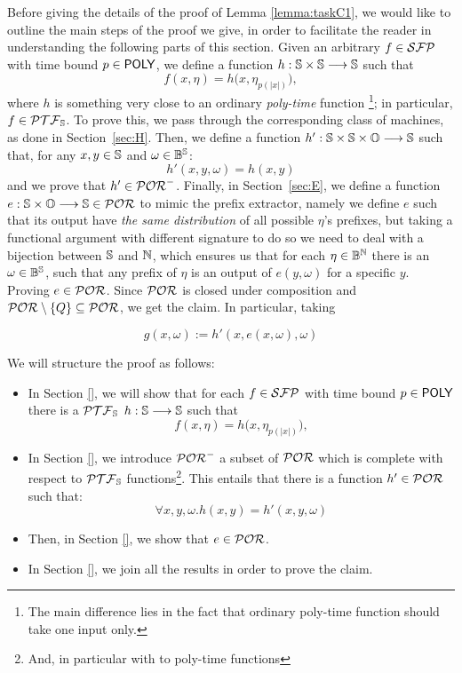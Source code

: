 Before giving the details of the proof of Lemma \ref{lemma:taskC1},
we would like to outline the main steps of the proof we give,
in order to facilitate the reader in understanding the following
parts of this section.
Given an arbitrary $f \in \mathcal{SFP}$ with time bound $p \in \mathsf{POLY}$,
we define a function $h:\mathbb{S} \times \mathbb{S} \longrightarrow \mathbb{S}$
such that
$$
f(x,\eta) = h\big(x, \eta_{p(|x|)}\big),
$$
where $h$ is something very close to an ordinary \emph{poly-time} function%
\footnote{The main difference lies in the fact that ordinary poly-time function should take one input only.}; in particular, $f \in \mathcal{PTF}_{\mathbb{S}}$.
To prove this, we pass
through the corresponding class of machines, as done in
Section~\ref{sec:H}.
%
Then, we define a function $h' : \mathbb{S} \times \mathbb{S} \times
\mathbb{O} \longrightarrow \mathbb{S}$ such that, for any $x,y\in \mathbb{S}$ and $\omega \in \mathbb{B}^{\mathbb{S}}$:
$$
h'(x,y,\omega) = h(x,y)
$$
and we prove that $h'\in \mathcal{POR}^-$.
%
Finally, in Section~\ref{sec:E},
we define a function
$e: \mathbb{S} \times \mathbb{O} \longrightarrow \mathbb{S} \in \mathcal{POR}$
 to mimic the prefix extractor, namely we
define $e$ such that its output have
\emph{the same distribution} of all possible $\eta$'s prefixes,
but taking a functional argument with different signature
to do so we need to deal with a bijection between $\mathbb{S}$ and $\mathbb{N}$,
which ensures us that for each $\eta \in \mathbb{B}^{\mathbb{N}}$
there is an $\omega\in \mathbb{B}^{\mathbb{S}}$, such that
any prefix of $\eta$ is an output of
$e(y, \omega)$ for a specific $y$.
Proving $e \in\mathcal{POR}$. Since $\mathcal{POR}$ is closed under composition and
$\mathcal{POR} \setminus \{Q\} \subseteq \mathcal{POR}$, we get the claim. In particular, taking

$$
g(x, \omega) := h'(x, e(x, \omega), \omega)
$$

%

We will structure the proof as follows:

\begin{itemize}
  \item In Section \ref{}, we will show that for each $f \in \mathcal{SFP}$
  with time bound $p \in \mathsf{POLY}$ there is a $\mathcal{PTF}_{\mathbb{S}}$ $h:\mathbb{S} \longrightarrow \mathbb{S}$
  such that
  $$
  f(x,\eta) = h\big( x, \eta_{p(|x|)}\big),
  $$
  \item In Section \ref{}, we introduce $\mathcal{POR}^-$
  a subset of $\mathcal{POR}$ which is complete
  with respect to $\mathcal{PTF}_{\mathbb{S}}$ functions\footnote{And, in particular with to poly-time functions}. This entails that there is a function
  $h' \in \mathcal{POR}$ such that:
  $$
  \forall x, y, \omega. h(x, y)=h'(x, y, \omega)
  $$
  \item Then, in Section \ref{}, we show that $e \in \mathcal{POR}$.
  \item In Section \ref{}, we join all the results in order to prove the claim.
\end{itemize}












